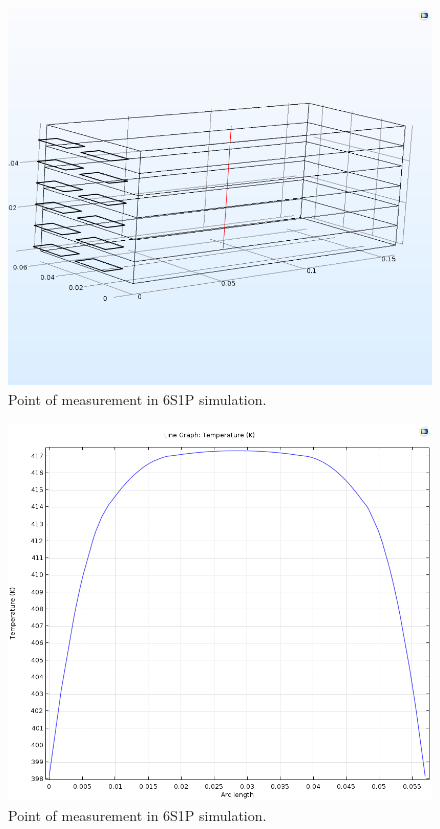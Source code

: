\begin{figure} [H]
	\centering
	\includegraphics[width=0.5\linewidth]{Figures/LineOutPlane.png}
	\caption{Point of measurement in 6S1P simulation.}
   \label{Fig:6_4}
\end{figure}

\begin{figure} [H]
	\centering
	\includegraphics[width=0.5\linewidth]{Figures/300s_10h_180A_2mOhm_OutOfPlaneLast_NoPouch.png}
	\caption{Point of measurement in 6S1P simulation.}
   \label{Fig:6_5}
\end{figure}



\newpage
